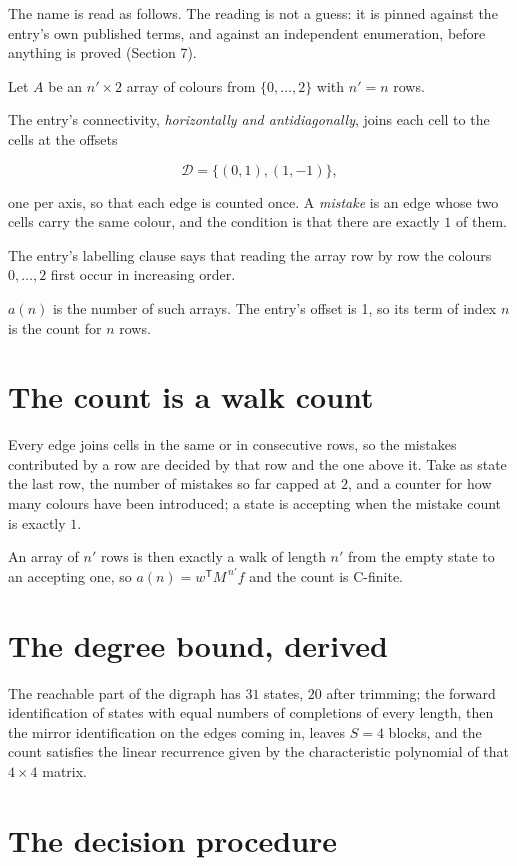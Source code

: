 \documentclass[11pt]{article}
\theoremstyle{definition}
\begin{document}
The name is read as follows. The reading is not a guess: it is pinned against the entry's own published terms, and against an independent enumeration, before anything is proved (Section 7).

Let $A$ be an $n' \times 2$ array of colours from $\{0,\dots,2\}$ with $n' = n$ rows.

The entry's connectivity, {\itshape horizontally and antidiagonally}, joins each cell to the cells at the offsets

\[\mathcal{D} = \{(0,1), (1,-1)\},\]

one per axis, so that each edge is counted once. A {\itshape mistake} is an edge whose two cells carry the same colour, and the condition is that there are exactly $1$ of them.

The entry's labelling clause says that reading the array row by row the colours $0,\dots,2$ first occur in increasing order.

$a(n)$ is the number of such arrays. The entry's offset is 1, so its term of index $n$ is the count for $n$ rows.

\section{The count is a walk count}

Every edge joins cells in the same or in consecutive rows, so the mistakes contributed by a row are decided by that row and the one above it. Take as state the last row, the number of mistakes so far capped at $2$, and a counter for how many colours have been introduced; a state is accepting when the mistake count is exactly $1$.

An array of $n'$ rows is then exactly a walk of length $n'$ from the empty state to an accepting one, so $a(n) = w^{\mathsf T}M^{\,n'}f$ and the count is C-finite.

\section{The degree bound, derived}

The reachable part of the digraph has $31$ states, $20$ after trimming; the forward identification of states with equal numbers of completions of every length, then the mirror identification on the edges coming in, leaves $S = 4$ blocks, and the count satisfies the linear recurrence given by the characteristic polynomial of that $4\times4$ matrix.

\section{The decision procedure}
\end{document}
